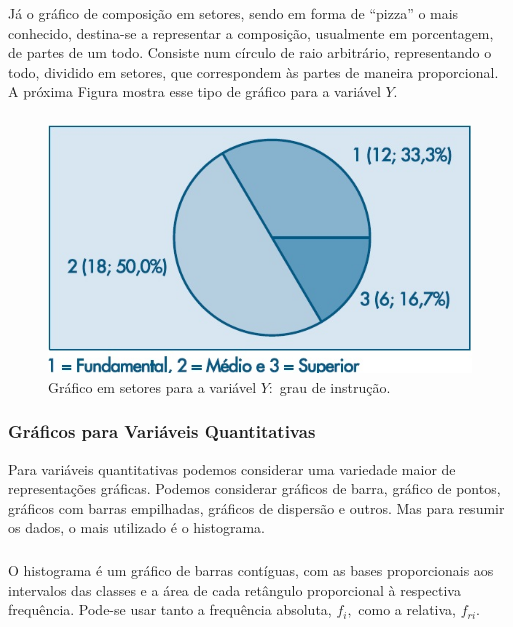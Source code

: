 \documentclass[14pt,aspectratio=1610]{beamer}
\begin{document}
\begin{frame}{}
\frametitle{}
\begin{block}{}
\justifying
Já o gráfico de composição em setores, sendo em forma de “pizza” o mais conhecido,
destina-se a representar a composição, usualmente em porcentagem, de partes de um todo.
Consiste num círculo de raio arbitrário, representando o todo, dividido em setores, que
correspondem às partes de maneira proporcional. A próxima Figura mostra esse tipo de gráfico para a variável $Y.$
\end{block}
\end{frame}

\begin{frame}{}
\frametitle{}
\begin{block}{}
\justifying
\begin{figure}[H]
    \centering
    \includegraphics[scale=0.5]{Fig4}
    \caption{Gráfico em setores para a variável $Y:$ grau de instrução.}
    \label{Fig4_ex}
  \end{figure}
\end{block}
\end{frame}

\begin{frame}{}
\frametitle{Gráficos para Variáveis Quantitativas}
\begin{block}{}
\justifying
Para variáveis quantitativas podemos considerar uma variedade maior de representações
gráficas. Podemos considerar gráficos de barra, gráfico de pontos, gráficos com barras 
empilhadas, gráficos de dispersão e outros. Mas para resumir os dados, o mais utilizado 
é o histograma.
\end{block}
\end{frame}

\begin{frame}{}
\frametitle{}
\begin{block}{}
\justifying
O histograma é um gráfico de barras contíguas, com as bases proporcionais aos intervalos
das classes e a área de cada retângulo proporcional à respectiva frequência. Pode-se
usar tanto a frequência absoluta, $f_{i},$ como a relativa, $f_{ri}.$
\end{block}
\end{frame}
\end{document}
